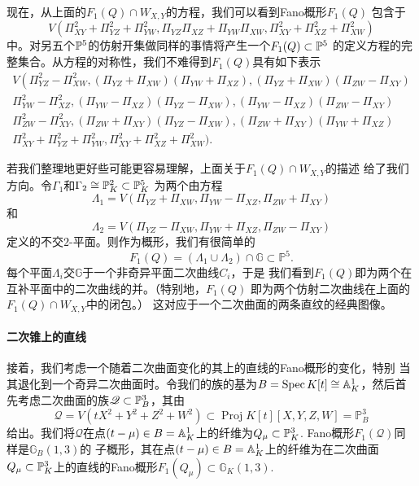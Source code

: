 现在，从上面的$F_1(Q)\cap W_{X,Y}$的方程，我们可以看到Fano概形$F_1(Q)$
包含于
\[
	V(\Pi_{XY}^2+\Pi_{YZ}^2+\Pi_{YW}^2,\Pi_{YZ}\Pi_{XZ}+\Pi_{YW}\Pi_{XW},\Pi_{XY}^2+\Pi_{XZ}^2+\Pi_{XW}^2)
\]
中。对另五个$\P^5$的仿射开集做同样的事情将产生一个$F_1(Q)\subset \P^5$
的定义方程的完整集合。从方程的对称性，我们不难得到$F_1(Q)$具有如下表示
\[
\begin{array}{l}{V\left(\Pi_{Y Z}^{2}-\Pi_{X W}^{2},\left(\Pi_{Y Z}+\Pi_{X W}\right)\left(\Pi_{Y W}+\Pi_{X Z}\right),\left(\Pi_{Y Z}+\Pi_{X W}\right)\left(\Pi_{Z W}-\Pi_{X Y}\right)\right.} \\ {\Pi_{Y W}^{2}-\Pi_{X Z}^{2},\left(\Pi_{Y W}-\Pi_{X Z}\right)\left(\Pi_{Y Z}-\Pi_{X W}\right),\left(\Pi_{Y W}-\Pi_{X Z}\right)\left(\Pi_{Z W}-\Pi_{X Y}\right)} \\ {\Pi_{Z W}^{2}-\Pi_{X Y}^{2},\left(\Pi_{Z W}+\Pi_{X Y}\right)\left(\Pi_{Y Z}-\Pi_{X W}\right),\left(\Pi_{Z W}+\Pi_{X Y}\right)\left(\Pi_{Y W}+\Pi_{X Z}\right)} \\ {\Pi_{X Y}^{2}+\Pi_{Y Z}^{2}+\Pi_{Y W}^{2}, \Pi_{X Y}^{2}+\Pi_{X Z}^{2}+\Pi_{X W}^{2} )}.\end{array}
\]

若我们整理地更好些可能更容易理解，上面关于$F_1(Q)\cap W_{X,Y}$的描述
给了我们方向。令$\Gamma_1$和$\Gamma_2\cong \P_K^2\subset \P_K^5$
为两个由方程
\[
	\Lambda_{1}=V\left(\Pi_{Y Z}+\Pi_{X W}, \Pi_{Y W}-\Pi_{X Z}, \Pi_{Z W}+\Pi_{X Y}\right)
\]
和
\[
	\Lambda_{2}=V\left(\Pi_{Y Z}-\Pi_{X W}, \Pi_{Y W}+\Pi_{X Z}, \Pi_{Z W}-\Pi_{X Y}\right)
\]
定义的不交$2$-平面。则作为概形，我们有很简单的
\[
	F_{1}(Q)=\left(\Lambda_{1} \cup \Lambda_{2}\right) \cap \mathbb{G} \subset \mathbb{P}^{5}.
\]%
%
%
每个平面$\Lambda_i$交$\mathbb G$于一个非奇异平面二次曲线$C_i$，于是
我们看到$F_1(Q)$即为两个在互补平面中的二次曲线的并。（特别地，$F_1(Q)$
即为两个仿射二次曲线在上面的$F_1(Q)\cap W_{X,Y}$中的闭包。）
这对应于一个二次曲面的两条直纹的经典图像。


\paragraph*{二次锥上的直线}
接着，我们考虑一个随着二次曲面变化的其上的直线的Fano概形的变化，特别
当其退化到一个奇异二次曲面时。令我们的族的基为$B=\spec K[t]\cong
\A_K^1$，然后首先考虑二次曲面的族$\mathscr Q\subset \P_B^3$，其由
\[
	\mathscr{Q}=V\left(t X^{2}+Y^{2}+Z^{2}+W^{2}\right) \subset \operatorname{Proj} K[t][X, Y, Z, W]=\mathbb{P}_{B}^{3}
\]
给出。我们将$\mathscr Q$在点$(t-\mu)\in B=\A_K^1$上的纤维为$Q_\mu
\subset \P_K^3$. Fano概形$F_1(\mathscr Q)$同样是$\mathbb G_B(1,3)$的
子概形，其在点$(t-\mu)\in B=\A_K^1$上的纤维为在二次曲面$Q_\mu\subset 
\P_K^3$上的直线的Fano概形$F_1(Q_\mu)\subset \mathbb G_K(1,3)$.

